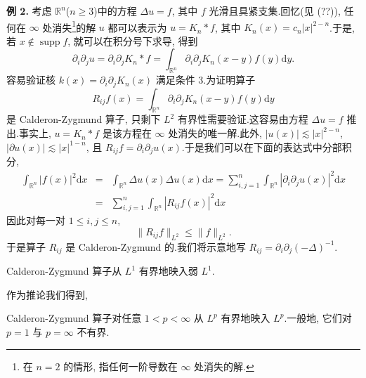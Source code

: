 \textbf{例 2.} 考虑 $\mathbb{R}^n$($n \geq 3$)中的方程 $\Delta u = f$, 其中 $f$ 光滑且具紧支集.回忆(见 (??)), 任何在 $\infty$ 处消失\footnote{在 $n = 2$ 的情形, 指任何一阶导数在 $\infty$ 处消失的解.}的解 $u$ 都可以表示为 $u = K_n * f$, 其中 $K_n(x) = c_n |x|^{2-n}$.于是, 若 $x \notin \operatorname{supp} f$, 就可以在积分号下求导, 得到
\[
\partial_i \partial_j u = \partial_i \partial_j K_n * f = \int_{\mathbb{R}^n} \partial_i \partial_j K_n (x-y) f(y) \mathrm{d}y.
\]
容易验证核 $k(x) = \partial_i \partial_j K_n(x)$ 满足条件 3.为证明算子
\[
R_{ij} f(x) = \int_{\mathbb{R}^n} \partial_i \partial_j K_n (x-y) f(y) \mathrm{d}y
\]
是 Calderon-Zygmund 算子, 只剩下 $L^2$ 有界性需要验证.这容易由方程 $\Delta u = f$ 推出.事实上, $u = K_n * f$ 是该方程在 $\infty$ 处消失的唯一解.此外, $|u(x)| \lesssim |x|^{2-n}$, $|\partial u(x)| \lesssim |x|^{1-n}$, 且 $R_{ij} f = \partial_i \partial_j u(x)$.于是我们可以在下面的表达式中分部积分,
\begin{equation}
\begin{array}{rcl}
\int_{\mathbb{R}^n} |f(x)|^2 \mathrm{d}x &=& \int_{\mathbb{R}^n} \Delta u(x) \Delta u(x) \mathrm{d}x = \sum_{i, j=1}^n \int_{\mathbb{R}^n} |\partial_i \partial_j u(x)|^2 \mathrm{d}x \\
&=& \sum_{i, j=1}^n \int_{\mathbb{R}^n} |R_{ij} f(x)|^2 \mathrm{d}x
\end{array}\label{eq:c6-252}
\end{equation}
因此对每一对 $1 \leq i, j \leq n$,
\[
\|R_{ij} f\|_{L^2} \leq \|f\|_{L^2}.
\]
于是算子 $R_{ij}$ 是 Calderon-Zygmund 的.我们将示意地写 $R_{ij} = \partial_i \partial_j (-\Delta)^{-1}$.

\begin{theorem}\label{thm:c6-6.3}
Calderon-Zygmund 算子从 $L^1$ 有界地映入弱 $L^1$.
\end{theorem}

作为推论我们得到,

\begin{corollary}\label{cor:c6-6.4}
Calderon-Zygmund 算子对任意 $1 < p < \infty$ 从 $L^p$ 有界地映入 $L^p$.一般地, 它们对 $p = 1$ 与 $p = \infty$ 不有界.
\end{corollary}

